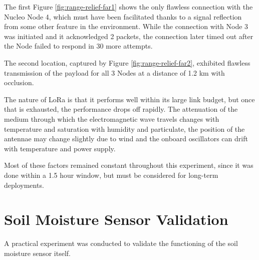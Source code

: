 The first Figure \ref{fig:range-relief-far1} shows the only flawless connection with the Nucleo Node 4, which must have been facilitated thanks to a signal reflection from some other feature in the environment. While the connection with Node 3 was initiated and it acknowledged 2 packets, the connection later timed out after the Node failed to respond in 30 more attempts.

The second location, captured by Figure \ref{fig:range-relief-far2}, exhibited flawless transmission of the payload for all 3 Nodes at a distance of 1.2 km with occlusion.

The nature of LoRa is that it performs well within its large link budget, but once that is exhausted, the performance drops off rapidly. The attenuation of the medium through which the electromagnetic wave travels changes with temperature and saturation with humidity and particulate, the position of the antennae may change slightly due to wind and the onboard oscillators can drift with temperature and power supply.

Most of these factors remained constant throughout this experiment, since it was done within a 1.5 hour window, but must be considered for long-term deployments.

\section{\label{section:sensor-validation}Soil Moisture Sensor Validation}
A practical experiment was conducted to validate the functioning of the soil moisture sensor itself.

